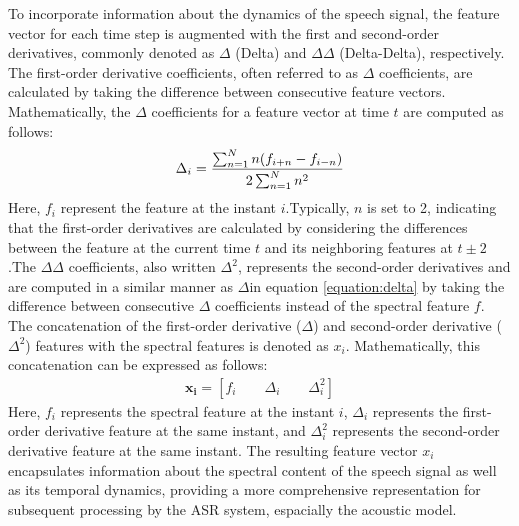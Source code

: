To incorporate information about the dynamics of the speech signal, the feature vector for each time step is augmented with the first and second-order derivatives, commonly denoted as $\Delta$ (Delta) and $\Delta\Delta$ (Delta-Delta), respectively. The first-order derivative coefficients, often referred to as $\Delta$ coefficients, are calculated by taking the difference between consecutive feature vectors. Mathematically, the $\Delta$ coefficients for a feature vector at time $t$ are computed as follows:
\begin{equation}
 \label{equation:delta}
    \Delta_i = \frac{\sum^{N}_{n=1}n(f_{i+n} - f_{i-n})}{2 \sum^N_{n=1}n^2} \\
\end{equation}
Here, $f_i$ represent the feature at the instant $i$.Typically, $n$ is set to 2, indicating that the first-order derivatives are calculated by considering the differences between the feature at the current time $t$ and its neighboring features at $t \pm 2$.The $\Delta\Delta$ coefficients, also written $\Delta^2$, represents the second-order derivatives and are computed in a similar manner as $\Delta$in equation \ref{equation:delta} by taking the difference between consecutive $\Delta$ coefficients instead of the spectral feature $f$. The concatenation of the first-order derivative ($\Delta$) and second-order derivative ($\Delta^2$) features with the spectral features is denoted as $x_i$. Mathematically, this concatenation can be expressed as follows:
\begin{align}
    \boldsymbol{x_i} = [f_i \qquad \Delta_i \qquad \Delta^{2}_i]
\end{align}
Here, $f_i$ represents the spectral feature at the instant $i$, $\Delta_i$ represents the first-order derivative feature at the same instant, and $\Delta^2_i$ represents the second-order derivative feature at the same instant. The resulting feature vector $x_i$ encapsulates information about the spectral content of the speech signal as well as its temporal dynamics, providing a more comprehensive representation for subsequent processing by the ASR system, espacially the acoustic model.

